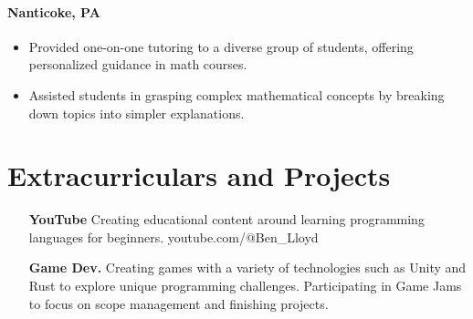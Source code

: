 \documentclass{article}
\begin{document}
\paragraph{Nanticoke, PA}
\begin{itemize}
  \itemsep0em 
  \item Provided one-on-one tutoring to a diverse group of students, offering personalized guidance in math courses.
  \item Assisted students in grasping complex mathematical concepts by breaking down topics into simpler explanations.
\end{itemize}

\section{Extracurriculars and Projects}
\begin{itemize}
  \itemsep0em 
  \item[\bfseries YouTube] Creating educational content around learning programming languages for beginners. youtube.com/@Ben\_Lloyd
  \item[\bfseries Game Dev.] Creating games with a variety of technologies such as Unity and Rust to explore unique programming challenges. Participating in Game Jams to focus on scope management and finishing projects.
\end{itemize}

\thispagestyle{empty}
\end{document}
